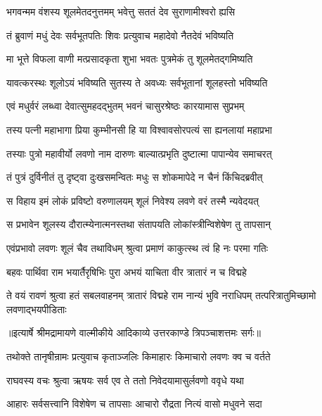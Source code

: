\twolineshloka
{भगवन्मम वंशस्य शूलमेतदनुत्तमम्}
{भवेत्तु सततं देव सुराणामीश्वरो ह्यसि} %

\twolineshloka
{तं ब्रुवाणं मधुं देवः सर्वभूतपतिः शिवः}
{प्रत्युवाच महादेवो नैतदेवं भविष्यति} %

\twolineshloka
{मा भूत्ते विफला वाणी मत्प्रसादकृता शुभा}
{भवतः पुत्रमेकं तु शूलमेतद्गमिष्यति} %

\twolineshloka
{यावत्करस्थः शूलोऽयं भविष्यति सुतस्य ते}
{अवध्यः सर्वभूतानां शूलहस्तो भविष्यति} %

\twolineshloka
{एवं मधुर्वरं लब्ध्वा देवात्सुमहदद्भुतम्}
{भवनं चासुरश्रेष्ठः कारयामास सुप्रभम्} %

\twolineshloka
{तस्य पत्नी महाभागा प्रिया कुम्भीनसी हि या}
{विश्वावसोरपत्यं सा ह्यनलायां महाप्रभा} %

\twolineshloka
{तस्याः पुत्रो महावीर्यो लवणो नाम दारुणः}
{बाल्यात्प्रभृति दुष्टात्मा पापान्येव समाचरत्} %

\twolineshloka
{तं पुत्रं दुर्विनीतं तु दृष्ट्वा दुःखसमन्वितः}
{मधुः स शोकमापेदे न चैनं किंचिदब्रवीत्} %

\twolineshloka
{स विहाय इमं लोकं प्रविष्टो वरुणालयम्}
{शूलं निवेश्य लवणे वरं तस्मै न्यवेदयत्} %

\twolineshloka
{स प्रभावेन शूलस्य दौरात्म्येनात्मनस्तथा}
{संतापयति लोकांस्त्रीन्विशेषेण तु तापसान्} %

\twolineshloka
{एवंप्रभावो लवणः शूलं चैव तथाविधम्}
{श्रुत्वा प्रमाणं काकुत्स्थ त्वं हि नः परमा गतिः} %

\twolineshloka
{बहवः पार्थिवा राम भयार्तैरृषिभिः पुरा}
{अभयं याचिता वीर त्रातारं न च विद्महे} %

\threelineshloka
{ते वयं रावणं श्रुत्वा हतं सबलवाहनम्}
{त्रातारं विद्महे राम नान्यं भुवि नराधिपम्}
{तत्परित्रातुमिच्छामो लवणाद्भयपीडिताः} %


{॥इत्यार्षे श्रीमद्रामायणे वाल्मीकीये आदिकाव्ये उत्तरकाण्डे त्रिपञ्चाशत्तमः सर्गः॥}


\twolineshloka
{तथोक्ते तानृषीन्रामः प्रत्युवाच कृताञ्जलिः}
{किमाहारः किमाचारो लवणः क्व च वर्तते} %

\twolineshloka
{राघवस्य वचः श्रुत्वा ऋषयः सर्व एव ते}
{ततो निवेदयामासुर्लवणो ववृधे यथा} %

\twolineshloka
{आहारः सर्वसत्त्वानि विशेषेण च तापसाः}
{आचारो रौद्रता नित्यं वासो मधुवने सदा} %

